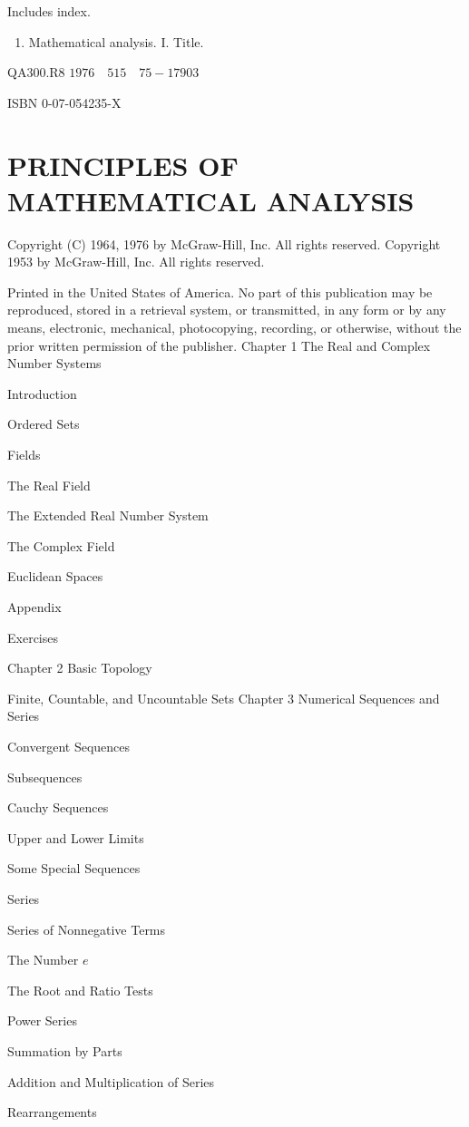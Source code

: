 \documentclass[10pt]{article}
\begin{document}
Includes index.

\begin{enumerate}
  \item Mathematical analysis. I. Title.
\end{enumerate}

QA300.R8 $1976 \quad 515 \quad 75-17903$

ISBN 0-07-054235-X

\section{PRINCIPLES OF MATHEMATICAL ANALYSIS}
Copyright (C) 1964, 1976 by McGraw-Hill, Inc. All rights reserved. Copyright 1953 by McGraw-Hill, Inc. All rights reserved.

Printed in the United States of America. No part of this publication may be reproduced, stored in a retrieval system, or transmitted, in any form or by any means, electronic, mechanical, photocopying, recording, or otherwise, without the prior written permission of the publisher. Chapter 1 The Real and Complex Number Systems

Introduction

Ordered Sets

Fields

The Real Field

The Extended Real Number System

The Complex Field

Euclidean Spaces

Appendix

Exercises

Chapter 2 Basic Topology

Finite, Countable, and Uncountable Sets Chapter 3 Numerical Sequences and Series

Convergent Sequences

Subsequences

Cauchy Sequences

Upper and Lower Limits

Some Special Sequences

Series

Series of Nonnegative Terms

The Number $e$

The Root and Ratio Tests

Power Series

Summation by Parts

Addition and Multiplication of Series

Rearrangements
\end{document}
